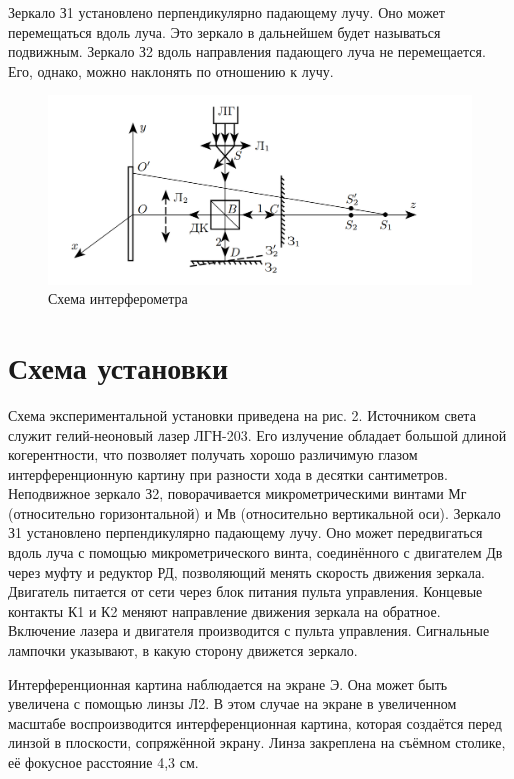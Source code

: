 \documentclass[15pt,a5paper,reqno]{article}
\begin{document}
Зеркало З1 установлено перпендикулярно падающему лучу. Оно может перемещаться вдоль луча. Это зеркало в дальнейшем будет называться подвижным. Зеркало З2 вдоль направления падающего луча не
перемещается. Его, однако, можно наклонять по отношению к лучу.

\begin{figure}[h!]
    \centering
    \includegraphics[width=1.2\linewidth]{pics/scheme.png}
    \caption{Схема интерферометра}
    \label{}
\end{figure}


\section{Схема установки}


Схема экспериментальной установки приведена на рис. 2. Источником света служит гелий-неоновый лазер
ЛГН-203. Его излучение обладает большой длиной когерентности, что
позволяет получать хорошо различимую глазом интерференционную
картину при разности хода в десятки сантиметров. Неподвижное зеркало З2, поворачивается микрометрическими винтами Мг (относительно горизонтальной) и Мв (относительно вертикальной оси). Зеркало З1
установлено перпендикулярно падающему лучу. Оно может передвигаться вдоль луча с помощью микрометрического винта, соединённого
с двигателем Дв через муфту и редуктор РД, позволяющий менять
скорость движения зеркала. Двигатель питается от сети через блок питания пульта управления. Концевые контакты К1 и К2 меняют направление движения зеркала на обратное. Включение лазера и двигателя
производится с пульта управления. Сигнальные лампочки указывают,
в какую сторону движется зеркало.

Интерференционная картина наблюдается на экране Э. Она может
быть увеличена с помощью линзы Л2. В этом случае на экране в увеличенном масштабе воспроизводится интерференционная картина, которая создаётся перед линзой в плоскости, сопряжённой экрану. Линза
закреплена на съёмном столике, её фокусное расстояние 4,3 см.
\end{document}
